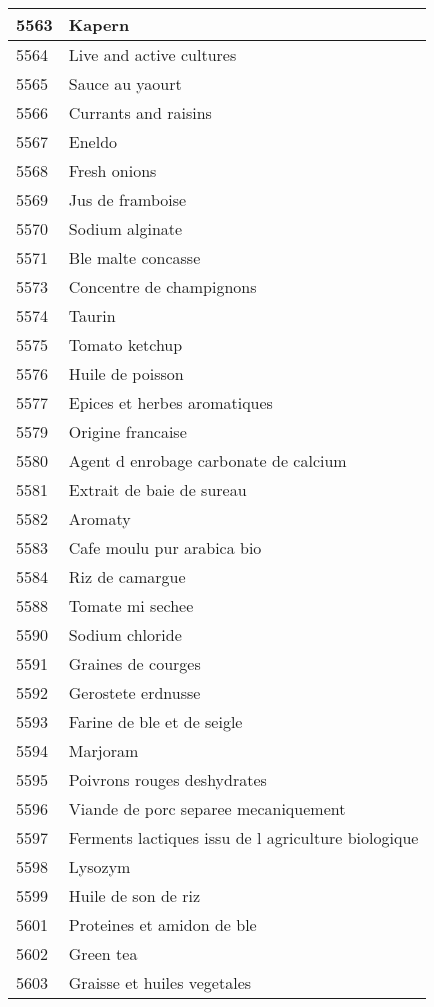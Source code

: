 \begin{longtable}{|l|l|}
5563 & Kapern \\ \hline 
5564 & Live and active cultures \\ \hline 
5565 & Sauce au yaourt \\ \hline 
5566 & Currants and raisins \\ \hline 
5567 & Eneldo \\ \hline 
5568 & Fresh onions \\ \hline 
5569 & Jus de framboise \\ \hline 
5570 & Sodium alginate \\ \hline 
5571 & Ble malte concasse \\ \hline 
5573 & Concentre de champignons \\ \hline 
5574 & Taurin \\ \hline 
5575 & Tomato ketchup \\ \hline 
5576 & Huile de poisson \\ \hline 
5577 & Epices et herbes aromatiques \\ \hline 
5579 & Origine francaise \\ \hline 
5580 & Agent d enrobage carbonate de calcium \\ \hline 
5581 & Extrait de baie de sureau \\ \hline 
5582 & Aromaty \\ \hline 
5583 & Cafe moulu pur arabica bio \\ \hline 
5584 & Riz de camargue \\ \hline 
5588 & Tomate mi sechee \\ \hline 
5590 & Sodium chloride \\ \hline 
5591 & Graines de courges \\ \hline 
5592 & Gerostete erdnusse \\ \hline 
5593 & Farine de ble et de seigle \\ \hline 
5594 & Marjoram \\ \hline 
5595 & Poivrons rouges deshydrates \\ \hline 
5596 & Viande de porc separee mecaniquement \\ \hline 
5597 & Ferments lactiques  issu de l agriculture biologique \\ \hline 
5598 & Lysozym \\ \hline 
5599 & Huile de son de riz \\ \hline 
5601 & Proteines et amidon de ble \\ \hline 
5602 & Green tea \\ \hline 
5603 & Graisse et huiles vegetales \\ \hline 

\end{longtable}
